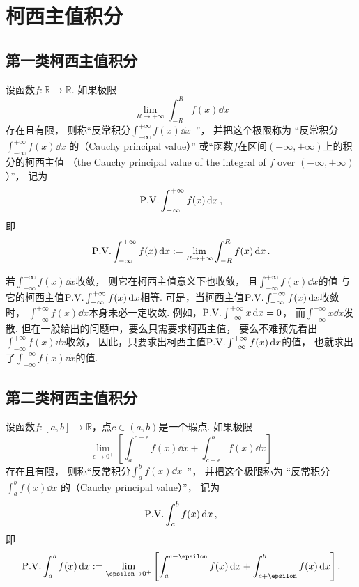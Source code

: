 \section{柯西主值积分}
\subsection{第一类柯西主值积分}
\begin{definition}
设函数\(f\colon\mathbb{R}\to\mathbb{R}\).
如果极限\[
	\lim_{R\to+\infty} \int_{-R}^R f(x) \dd{x}
\]存在且有限，
则称“反常积分\(\int_{-\infty}^{+\infty} f(x) \dd{x}\)~”，
并把这个极限称为
“反常积分\(\int_{-\infty}^{+\infty} f(x) \dd{x}\)
的（Cauchy principal value）”
或“函数\(f\)在区间\((-\infty,+\infty)\)上的积分的柯西主值
（the Cauchy principal value of the integral of \(f\) over \((-\infty,+\infty)\)）”，
记为\[
	\pvint_{-\infty}^{+\infty} f(x) \dd{x},
\]
即\[
	\pvint_{-\infty}^{+\infty} f(x) \dd{x}
	\defeq \lim_{R\to+\infty} \int_{-R}^R f(x) \dd{x}.
\]
\end{definition}

若\(\int_{-\infty}^{+\infty} f(x) \dd{x}\)收敛，
则它在柯西主值意义下也收敛，
且\(\int_{-\infty}^{+\infty} f(x) \dd{x}\)的值
与它的柯西主值\(\pvint_{-\infty}^{+\infty} f(x) \dd{x}\)相等.
可是，当柯西主值\(\pvint_{-\infty}^{+\infty} f(x) \dd{x}\)收敛时，
\(\int_{-\infty}^{+\infty} f(x) \dd{x}\)本身未必一定收敛.
例如，\(\pvint_{-\infty}^{+\infty} x \dd{x} = 0\)，
而\(\int_{-\infty}^{+\infty} x \dd{x}\)发散.
但在一般给出的问题中，要么只需要求柯西主值，
要么不难预先看出\(\int_{-\infty}^{+\infty} f(x) \dd{x}\)收敛，
因此，只要求出柯西主值\(\pvint_{-\infty}^{+\infty} f(x) \dd{x}\)的值，
也就求出了\(\int_{-\infty}^{+\infty} f(x) \dd{x}\)的值.

\subsection{第二类柯西主值积分}
\begin{definition}
设函数\(f\colon[a,b]\to\mathbb{R}\)，点\(c\in(a,b)\)是一个瑕点.
如果极限\[
	\lim_{\epsilon\to0^+} \left[
		\int_a^{c-\epsilon} f(x) \dd{x}
		+ \int_{c+\epsilon}^b f(x) \dd{x}
	\right]
\]存在且有限，
则称“反常积分\(\int_a^b f(x) \dd{x}\)~”，
并把这个极限称为
“反常积分\(\int_a^b f(x) \dd{x}\)
的（Cauchy principal value）”，
记为\[
	\pvint_a^b f(x) \dd{x},
\]
即\[
	\pvint_a^b f(x) \dd{x}
	\defeq \lim_{\epsilon\to0^+} \left[
		\int_a^{c-\epsilon} f(x) \dd{x}
		+ \int_{c+\epsilon}^b f(x) \dd{x}
	\right].
\]
\end{definition}

